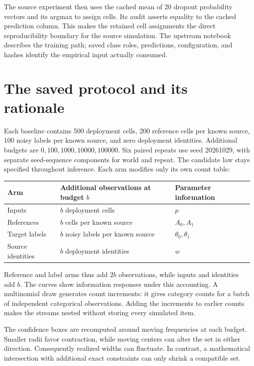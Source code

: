 \documentclass[11pt,a4paper]{report}
\begin{document}
The source experiment then uses the cached mean of 20 dropout probability vectors and its argmax to assign cells. Its audit asserts equality to the cached prediction column. This makes the retained cell assignments the direct reproducibility boundary for the source simulation. The upstream notebook describes the training path; saved class roles, predictions, configuration, and hashes identify the empirical input actually consumed.

\section{The saved protocol and its rationale}
Each baseline contains 500 deployment cells, 200 reference cells per known source, 100 noisy labels per known source, and zero deployment identities. Additional budgets are $0,100,1000,10000,100000$. Six paired repeats use seed 20261029, with separate seed-sequence components for world and repeat. The candidate law stays specified throughout inference. Each arm modifies only its own count table:
\begin{center}
\begin{tabular}{lll}\toprule
Arm & Additional observations at budget $b$ & Parameter information\\\midrule
Inputs & $b$ deployment cells & $p$\\
References & $b$ cells per known source & $A_0,A_1$\\
Target labels & $b$ noisy labels per known source & $\theta_0,\theta_1$\\
Source identities & $b$ deployment identities & $w$\\\bottomrule
\end{tabular}
\end{center}
Reference and label arms thus add $2b$ observations, while inputs and identities add $b$. The curves show information responses under this accounting. A multinomial draw generates count increments: it gives category counts for a batch of independent categorical observations. Adding the increments to earlier counts makes the streams nested without storing every simulated item.

The confidence boxes are recomputed around moving frequencies at each budget. Smaller radii favor contraction, while moving centers can alter the set in either direction. Consequently realized widths can fluctuate. In contrast, a mathematical intersection with additional exact constraints can only shrink a compatible set.
\end{document}
